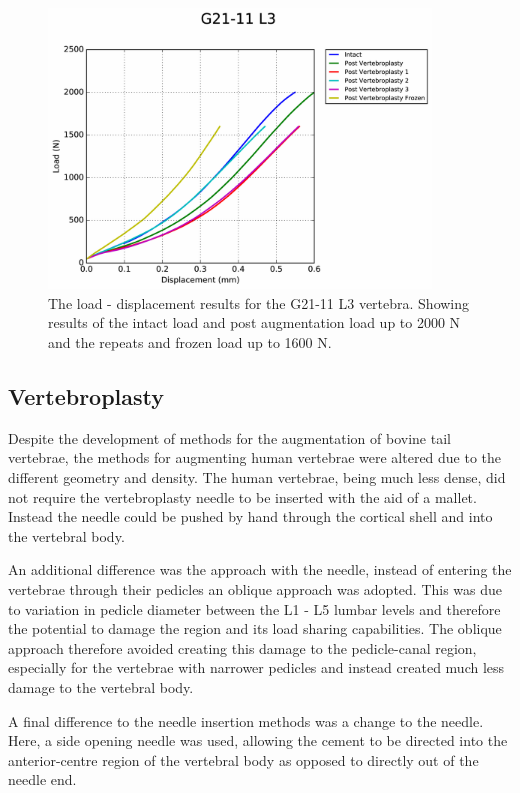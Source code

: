 \begin{figure}[ht!]
  \centering
  \includegraphics[width=4in]{Chapters/Chapter_HT_images/G21-11_L3.pdf}
  \caption{The load - displacement results for the G21-11 L3 vertebra. Showing
    results of the intact load and post augmentation load up to 2000 N and the
    repeats and frozen load up to 1600 N.}
  \label{fig:G21-11_L3}
\end{figure}






\subsection{Vertebroplasty}

Despite the development of methods for the augmentation of bovine tail
vertebrae, the methods for augmenting human vertebrae were altered due to the
different geometry and density. The human vertebrae, being much less dense, did
not require the vertebroplasty needle to be inserted with the aid of a mallet.
Instead the needle could be pushed by hand through the cortical shell and into
the vertebral body.

An additional difference was the approach with the needle, instead of entering
the vertebrae through their pedicles an oblique approach was adopted. This was
due to variation in pedicle diameter between the L1 - L5 lumbar levels and
therefore the potential to damage the region and its load sharing capabilities.
The oblique approach therefore avoided creating this damage to the pedicle-canal
region, especially for the vertebrae with narrower pedicles and instead created
much less damage to the vertebral body.

A final difference to the needle insertion methods was a change to the needle.
Here, a side opening needle was used, allowing the cement to be directed into
the anterior-centre region of the vertebral body as opposed to directly out of
the needle end.

